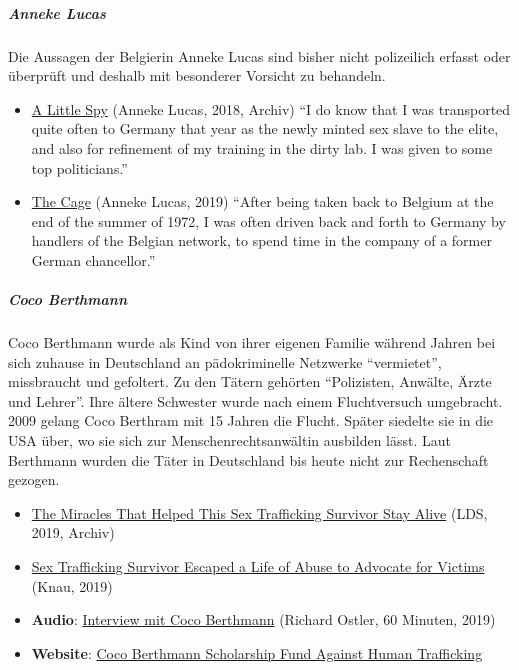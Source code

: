 \hypertarget{anneke-lucas-1}{%
\subparagraph{\texorpdfstring{\textbf{Anneke
Lucas}}{Anneke Lucas}}\label{anneke-lucas-1}}

Die Aussagen der Belgierin Anneke Lucas sind bisher nicht polizeilich
erfasst oder überprüft und deshalb mit besonderer Vorsicht zu behandeln.

\begin{itemize}
\tightlist
\item
  \href{https://web.archive.org/web/20190720020603/https://annekelucas.com/writing/2018/8/22/a-little-spy}{A
  Little Spy} (Anneke Lucas, 2018, Archiv) ``I do know that I was
  transported quite often to Germany that year as the newly minted sex
  slave to the elite, and also for refinement of my training in the
  dirty lab. I was given to some top politicians.''
\item
  \href{https://swprs.files.wordpress.com/2019/08/anneke-lucas-july-2019.pdf}{The
  Cage} (Anneke Lucas, 2019) ``After being taken back to Belgium at the
  end of the summer of 1972, I was often driven back and forth to
  Germany by handlers of the Belgian network, to spend time in the
  company of a former German chancellor.''
\end{itemize}

\hypertarget{coco-berthmann}{%
\subparagraph{\texorpdfstring{\textbf{Coco
Berthmann}}{Coco Berthmann}}\label{coco-berthmann}}

Coco Berthmann wurde als Kind von ihrer eigenen Familie während Jahren
bei sich zuhause in Deutschland an pädokriminelle Netzwerke
``vermietet'', missbraucht und gefoltert. Zu den Tätern gehörten
``Polizisten, Anwälte, Ärzte und Lehrer''. Ihre ältere Schwester wurde
nach einem Fluchtversuch umgebracht. 2009 gelang Coco Berthram mit 15
Jahren die Flucht. Später siedelte sie in die USA über, wo sie sich zur
Menschenrechtsanwältin ausbilden lässt. Laut Berthmann wurden die Täter
in Deutschland bis heute nicht zur Rechenschaft gezogen.

\begin{itemize}
\tightlist
\item
  \href{https://web.archive.org/web/20190813014050/http://www.ldsliving.com/The-Incredible-Miracles-that-Helped-This-Sex-Trafficking-Survivor-Stay-Alive-How-God-Led-Her-to-the-Gospel/s/90620}{The
  Miracles That Helped This Sex Trafficking Survivor Stay Alive} (LDS,
  2019, Archiv)
\item
  \href{https://www.knau.org/post/sex-trafficking-survivor-escaped-life-abuse-advocate-victims}{Sex
  Trafficking Survivor Escaped a Life of Abuse to Advocate for Victims}
  (Knau, 2019)
\item
  \textbf{Audio}:
  \href{https://player.fm/series/listen-learn-love-hosted-by-richard-ostler/episode-76-coco-berthmann-25-convert-survivor-of-childhuman-trafficking-following-her-dreams}{Interview
  mit Coco Berthmann} (Richard Ostler, 60 Minuten, 2019)
\item
  \textbf{Website}:
  \href{https://www.cocoberthmannscholarship.com/}{Coco Berthmann
  Scholarship Fund Against Human Trafficking}
\end{itemize}

